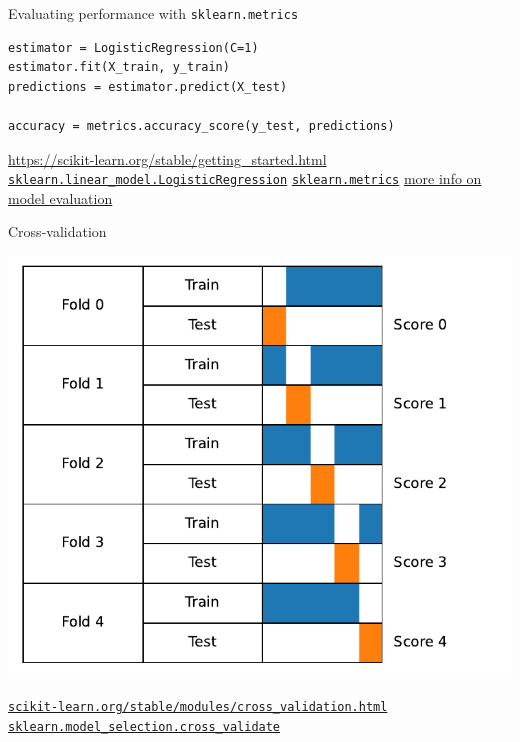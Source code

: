 \documentclass[presentation,mathserif,table]{beamer}
\begin{document}
\begin{frame}[label={sec:org99e18f7},fragile]{Evaluating performance with \texttt{sklearn.metrics}}
 \begin{verbatim}
estimator = LogisticRegression(C=1)
estimator.fit(X_train, y_train)
predictions = estimator.predict(X_test)

accuracy = metrics.accuracy_score(y_test, predictions)
\end{verbatim}
\vfill
\url{https://scikit-learn.org/stable/getting\_started.html}
\href{https://scikit-learn.org/stable/modules/generated/sklearn.linear\_model.LogisticRegression.html}{\texttt{sklearn.linear\_model.LogisticRegression}}
\href{https://scikit-learn.org/stable/modules/classes.html\#module-sklearn.metrics}{\texttt{sklearn.metrics}}
\href{https://scikit-learn.org/stable/modules/model\_evaluation.html\#the-scoring-parameter-defining-model-evaluation-rules}{more info on model evaluation}
\end{frame}
\begin{frame}[label={sec:org13244eb},fragile]{Cross-validation}
 \begin{center}
\includegraphics[height=.7 \textheight]{cv_figure_simple.pdf}
\end{center}

\href{https://scikit-learn.org/stable/modules/cross\_validation.html}{\texttt{scikit-learn.org/stable/modules/cross\_validation.html}}
\href{https://scikit-learn.org/stable/modules/generated/sklearn.model\_selection.GridSearchCV.html}{\texttt{sklearn.model\_selection.cross\_validate}}
\end{frame}
\end{document}
